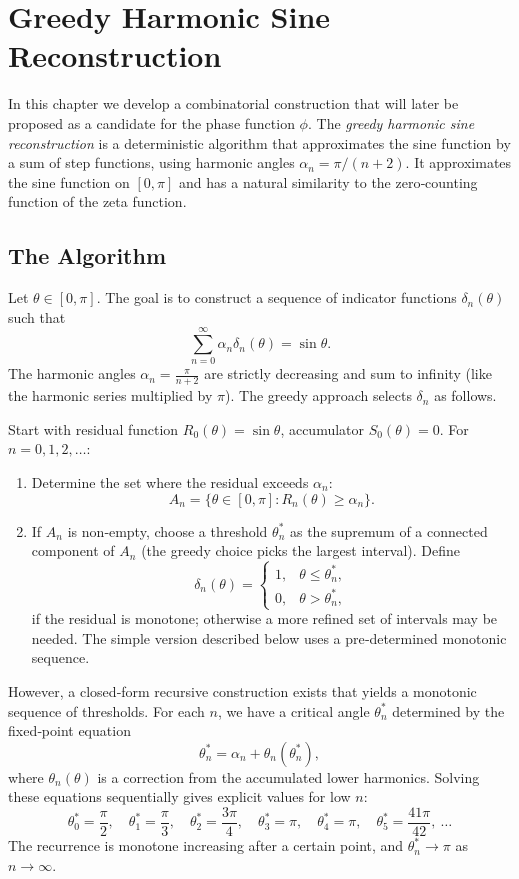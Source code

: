 \documentclass[12pt,a4paper,oneside]{book}
\begin{document}
\chapter{Greedy Harmonic Sine Reconstruction}

In this chapter we develop a combinatorial construction that will later be proposed as a candidate for the phase function \(\phi\).  The \emph{greedy harmonic sine reconstruction} is a deterministic algorithm that approximates the sine function by a sum of step functions, using harmonic angles \(\alpha_n = \pi/(n+2)\).  It approximates the sine function on \([0,\pi]\) and has a natural similarity to the zero‑counting function of the zeta function.

\section{The Algorithm}

Let \(\theta\in[0,\pi]\).  The goal is to construct a sequence of indicator functions \(\delta_n(\theta)\) such that
\[
\sum_{n=0}^{\infty} \alpha_n \delta_n(\theta) = \sin\theta .
\]
The harmonic angles \(\alpha_n = \frac{\pi}{n+2}\) are strictly decreasing and sum to infinity (like the harmonic series multiplied by \(\pi\)).  The greedy approach selects \(\delta_n\) as follows.

Start with residual function \(R_0(\theta)=\sin\theta\), accumulator \(S_0(\theta)=0\).  For \(n=0,1,2,\dots\):
\begin{enumerate}
\item Determine the set where the residual exceeds \(\alpha_n\): 
\[
A_n = \{\theta\in[0,\pi] : R_n(\theta) \ge \alpha_n\}.
\]
\item If \(A_n\) is non‑empty, choose a threshold \(\theta_n^*\) as the supremum of a connected component of \(A_n\) (the greedy choice picks the largest interval).  Define
\[
\delta_n(\theta) = \begin{cases}
1, & \theta\le\theta_n^*,\\
0, & \theta>\theta_n^*,
\end{cases}
\]
if the residual is monotone; otherwise a more refined set of intervals may be needed.  The simple version described below uses a pre‑determined monotonic sequence.
\end{enumerate}

However, a closed‑form recursive construction exists that yields a monotonic sequence of thresholds.  For each \(n\), we have a critical angle \(\theta_n^*\) determined by the fixed‑point equation
\[
\theta_n^* = \alpha_n + \theta_n(\theta_n^*),
\]
where \(\theta_n(\theta)\) is a correction from the accumulated lower harmonics.  Solving these equations sequentially gives explicit values for low \(n\):
\[
\theta_0^* = \frac{\pi}{2},\quad \theta_1^* = \frac{\pi}{3},\quad \theta_2^* = \frac{3\pi}{4},\quad \theta_3^* = \pi,\quad \theta_4^* = \pi,\quad \theta_5^* = \frac{41\pi}{42},\ \dots
\]
The recurrence is monotone increasing after a certain point, and \(\theta_n^* \to \pi\) as \(n\to\infty\).
\end{document}
